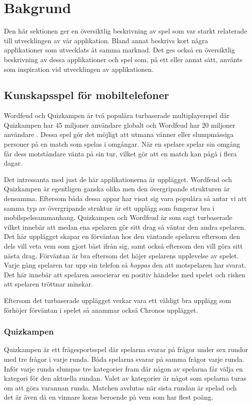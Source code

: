 \documentclass[a4paper, 11pt]{article}
\begin{document}
\section{Bakgrund}
Den här sektionen ger en översiktlig beskrivning av spel som var starkt relaterade till utvecklingen av vår applikation. Bland annat beskrivs kort några applikationer som utvecklats åt samma marknad. Det ges också en översiktlig beskrivning av dessa applikationer och spel som, på ett eller annat sätt, använts som inspiration vid utvecklingen av applikationen. 

\subsection{Kunskapsspel för mobiltelefoner}
Wordfeud och Quizkampen är två populära turbaserade multiplayerspel där Quizkampen har 45 miljoner användare globalt \cite{quiz} och Wordfeud har 20 miljoner användare \cite{wordfeud}. Dessa spel gör det möjligt att utmana vänner eller slumpmässiga personer på en match som spelas i omgångar. När en spelare spelar sin omgång får dess motståndare vänta på sin tur, vilket gör att en match kan pågå i flera dagar.

Det intressanta med just de här applikationerna är upplägget. Wordfeud och Quizkampen är egentligen ganska olika men den övergripande strukturen är densamma. Eftersom båda dessa appar har visat sig vara populära så antar vi att samma typ av övergripande struktur är ett upplägg som fungerar bra i mobilspelssammanhang. Quizkampen och Wordfeud är som sagt turbaserade vilket innebär att medan ena spelaren gör sitt drag så väntar den andra spelaren. Det här upplägget skapar en förväntan hos den väntande spelaren eftersom den dels vill veta vem som gjort bäst ifrån sig, samt också eftersom den vill göra sitt nästa drag. Förväntan är bra eftersom det höjer spelarens upplevelse av spelet. Varje gång spelaren tar upp sin telefon så \textit{hoppas} den att motspelaren har svarat. Det här innebär att spelaren associerar en positiv händelse med spelet och risken att spelaren tröttnar minskar.

Eftersom det turbaserade upplägget verkar vara ett väldigt bra upplägg som förhöjer förväntan i spelet så anammar också Chronos upplägget. 

\subsubsection{Quizkampen}
Quizkampen \cite{aboutquiz} är ett frågesportsspel där spelarna svarar på frågor under sex rundor med tre frågor i varje runda. Båda spelarna svarar på samma frågor varje runda.  Inför varje runda slumpas tre kategorier fram där någon av spelarna får välja en kategori för den aktuella rundan. Valet av kategorier är något som spelarna turas om att göra varannan runda. Matchen avslutas när sista rundan är spelad och det är även då en vinnare koras beroende på vem som har flest poäng. 
\end{document}
